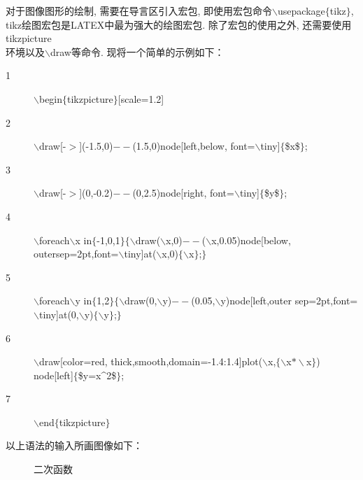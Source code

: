 对于图像图形的绘制, 需要在导言区引入宏包, 即使用宏包命令$\backslash$usepackage$\{$tikz$\}$, tikz绘图宏包是LATEX中最为强大的绘图宏包. 除了宏包的使用之外, 还需要使用tikzpicture\\环境以及$\backslash$draw等命令. 现将一个简单的示例如下：
\begin{description}
    \item[1]$\backslash$begin$\{$tikzpicture$\}$[scale=1.2]
    \item[2]$\backslash$draw[-$>$](-1.5,0)$--$(1.5,0)node[left,below,
        font=$\backslash$tiny]$\{$\$x\$$\}$;
    \item[3] $\backslash$draw[-$>$](0,-0.2)$--$(0,2.5)node[right,
        font=$\backslash$tiny]$\{$\$y\$$\}$;
    \item[4]$\backslash$foreach$\backslash$x in$\{$-1,0,1$\}\{\backslash$draw($\backslash$x,0)$--$($\backslash$x,0.05)node[below,
        outersep=2pt,font=$\backslash$tiny]at($\backslash$x,0)$\{\backslash$x$\}$;$\}$
    \item[5]$\backslash$foreach$\backslash$y in$\{$1,2$\}\{\backslash$draw(0,$\backslash$y)$--$(0.05,$\backslash$y)node[left,outer sep=2pt,font=$\backslash$tiny]at(0,$\backslash$y)$\{\backslash$y$\}$;$\}$
    \item[6]$\backslash$draw[color=red, thick,smooth,domain=-1.4:1.4]plot($\backslash$x,$\{\backslash$x$*\backslash$x$\}$)
        node[left]$\{$\$y=x\^{}2\$$\}$;
    \item[7]$\backslash$end$\{$tikzpicture$\}$
  \end{description}
  \noindent 以上语法的输入所画图像如下：
  \begin{figure}[H]
  \centering
    \vspace*{-13pt}
  \caption{二次函数}\vspace*{-13pt}
  \end{figure}

